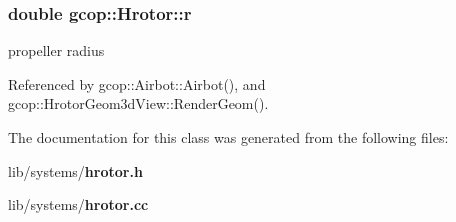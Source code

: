 \subsubsection[{r}]{\setlength{\rightskip}{0pt plus 5cm}double {\bf gcop\-::\-Hrotor\-::r}}\label{classgcop_1_1Hrotor_a75c3dc8108a54beff1f41b06d7219dc5}


propeller radius 



\-Referenced by gcop\-::\-Airbot\-::\-Airbot(), and gcop\-::\-Hrotor\-Geom3d\-View\-::\-Render\-Geom().



\-The documentation for this class was generated from the following files\-:\begin{DoxyCompactItemize}
\item 
lib/systems/{\bf hrotor.\-h}\item 
lib/systems/{\bf hrotor.\-cc}\end{DoxyCompactItemize}
